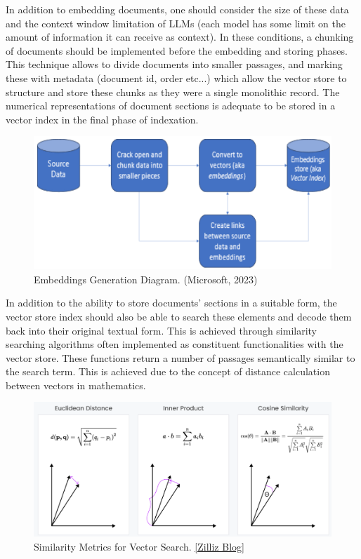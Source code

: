 In addition to embedding documents, one should consider the size of these data and the context window limitation of LLMs (each model has some limit on the amount of information it can receive as context). In these conditions, a chunking of documents should be implemented before the embedding and storing phases. This technique allows to divide documents into smaller passages, and marking these with metadata (document id, order etc...) which allow the vector store to structure and store these chunks as they were a single monolithic record. The numerical representations of document sections is adequate to be stored in a vector index in the final phase of indexation.
\begin{figure}[htbp]
    \centering
    \includegraphics[width=\linewidth]{./figures/chunking-embedding-diagram.png}
    \caption{Embeddings Generation Diagram. (Microsoft, 2023)}
\end{figure}\newline
In addition to the ability to store documents' sections in a suitable form, the vector store index should also be able to search these elements and decode them back into their original textual form. This is achieved through similarity searching algorithms often implemented as constituent functionalities with the vector store. These functions return a number of passages semantically similar to the search term. This is achieved due to the concept of distance calculation between vectors in mathematics.
\begin{figure}[htbp]
    \centering
    \includegraphics[width=\linewidth]{./figures/vector-distance-metrics.png}
    \caption{Similarity Metrics for Vector Search. \href{https://zilliz.com/blog/similarity-metrics-for-vector-search}{[Zilliz Blog]}}
\end{figure}
\newpage

